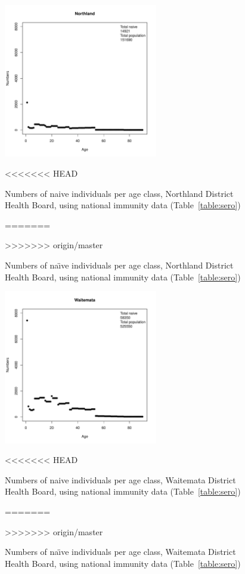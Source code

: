 \documentclass{article}
\begin{document}
\begin{itemize}
\begin{figure}[H]
     \begin{center}
     \includegraphics[width=0.6\textwidth]{dhb1.pdf}
     \end{center}
<<<<<<< HEAD
     \caption{Numbers of naive individuals per age class, Northland District Health Board, using national immunity data (Table~\ref{table:sero})}
=======
     \caption{Numbers of na\"{\i}ve individuals per age class, Northland District Health Board, using national immunity data (Table~\ref{table:sero})}
>>>>>>> origin/master
     \label{fig:Northland}
\end{figure}


\begin{figure}[H]
     \begin{center}
     \includegraphics[width=0.6\textwidth]{dhb2.pdf}
     \end{center}
<<<<<<< HEAD
     \caption{Numbers of naive individuals per age class, Waitemata District Health Board, using national immunity data (Table~\ref{table:sero})}
=======
     \caption{Numbers of na\"{\i}ve individuals per age class, Waitemata District Health Board, using national immunity data (Table~\ref{table:sero})}
>>>>>>> origin/master
     \label{fig:Waitemata}
\end{figure}


\end{itemize}
\end{document}
